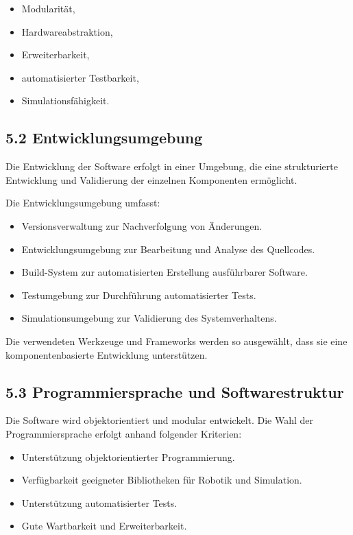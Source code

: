 \documentclass[
  a4paper,
  12pt,
  DIV=12,        %
  parskip=half,  %
  headings=small %
]{scrartcl}
\theoremstyle{definition}
\providecommand{\tightlist}{%
  \setlength{\itemsep}{0pt}\setlength{\parskip}{0pt}}
\theoremstyle{definition}
\providecommand{\tightlist}{%
  \setlength{\itemsep}{0pt}\setlength{\parskip}{0pt}}
\begin{document}
\begin{itemize}
\tightlist
\item
  Modularität,
\item
  Hardwareabstraktion,
\item
  Erweiterbarkeit,
\item
  automatisierter Testbarkeit,
\item
  Simulationsfähigkeit.
\end{itemize}

\subsection{5.2 Entwicklungsumgebung}\label{entwicklungsumgebung}

Die Entwicklung der Software erfolgt in einer Umgebung, die eine
strukturierte Entwicklung und Validierung der einzelnen Komponenten
ermöglicht.

Die Entwicklungsumgebung umfasst:

\begin{itemize}
\tightlist
\item
  Versionsverwaltung zur Nachverfolgung von Änderungen.
\item
  Entwicklungsumgebung zur Bearbeitung und Analyse des Quellcodes.
\item
  Build-System zur automatisierten Erstellung ausführbarer Software.
\item
  Testumgebung zur Durchführung automatisierter Tests.
\item
  Simulationsumgebung zur Validierung des Systemverhaltens.
\end{itemize}

Die verwendeten Werkzeuge und Frameworks werden so ausgewählt, dass sie
eine komponentenbasierte Entwicklung unterstützen.

\subsection{5.3 Programmiersprache und
Softwarestruktur}\label{programmiersprache-und-softwarestruktur}

Die Software wird objektorientiert und modular entwickelt. Die Wahl der
Programmiersprache erfolgt anhand folgender Kriterien:

\begin{itemize}
\tightlist
\item
  Unterstützung objektorientierter Programmierung.
\item
  Verfügbarkeit geeigneter Bibliotheken für Robotik und Simulation.
\item
  Unterstützung automatisierter Tests.
\item
  Gute Wartbarkeit und Erweiterbarkeit.
\end{itemize}
\end{document}
